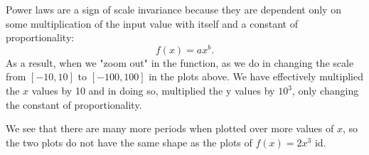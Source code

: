 \documentclass{article}
\begin{document}
Power laws are a sign of scale invariance because they are dependent only on some multiplication of the input value with itself and a constant of proportionality:
\[f(x) = ax^b.\]
As a result, when we "zoom out" in the function, as we do in changing the scale from $[-10, 10]$  to $[-100,100]$ in the plots above. We have effectively multiplied the $x$ values by 10 and in doing so, multiplied the y values by $10^3$, only changing the constant of proportionality. 

\begin{center}
\end{center}

\begin{center}
\end{center}

We see that there are many more periods when plotted over more values of $x$, so the two plots do not have the same shape as the plots of $f(x) = 2x^3$ id. 
\end{document}
